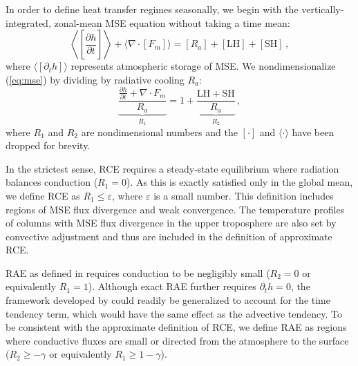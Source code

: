 \documentclass{ametsocV5}
\begin{document}
    In order to define heat transfer regimes seasonally, we begin with the vertically-integrated, zonal-mean MSE equation without taking a time mean:
    \begin{equation} \label{eq:mse}
        \left\langle\left[\frac{\partial h}{\partial t}\right]\right\rangle + \langle\nabla\cdot [F_{m}]\rangle = [R_{a}] + \mathrm{[LH]+[SH]} \, ,
    \end{equation}
    where $\langle[\partial_t h]\rangle$ represents atmospheric storage of MSE. We nondimensionalize (\ref{eq:mse}) by dividing by radiative cooling $R_a$:
    \begin{equation}
        {\underbrace{\frac{\frac{\partial h }{\partial t} + \nabla\cdot F_{m}}{R_{a}}}_{R_1}} = 1 + {\underbrace{\frac{\mathrm{LH+SH}}{R_{a}}}_{R_2}} \, ,
    \end{equation}
    where $R_1$ and $R_2$ are nondimensional numbers and the $[\cdot]$ and $\langle\cdot\rangle$ have been dropped for brevity. 

    In the strictest sense, RCE requires a steady-state equilibrium where radiation balances conduction (\(R_{1}=0\)). As this is exactly satisfied only in the global mean, we define RCE as \(R_{1}\le \varepsilon\), where $\varepsilon$ is a small number. This definition includes regions of MSE flux divergence and weak convergence. The temperature profiles of columns with MSE flux divergence in the upper troposphere are also set by convective adjustment \citep{warren2020} and thus are included in the definition of approximate RCE.

    RAE as defined in \cite{cronin2016} requires conduction to be negligibly small (\(R_{2}=0\) or equivalently \(R_{1}=1\)). Although exact RAE further requires $\partial_t h=0$, the framework developed by \cite{cronin2016} could readily be generalized to account for the time tendency term, which would have the same effect as the advective tendency. To be consistent with the approximate definition of RCE, we define RAE as regions where conductive fluxes are small or directed from the atmosphere to the surface (\(R_{2} \ge -\gamma \) or equivalently \(R_{1} \ge 1-\gamma\)).
\end{document}
